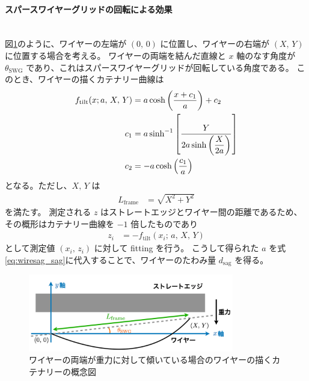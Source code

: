 \documentclass[../../main.tex]{subfiles}
\begin{document}
\paragraph{スパースワイヤーグリッドの回転による効果}\quad\\
\indent
図\ref{fig:wiresag_concept_tilt}のように、ワイヤーの左端が $(0,\,0)$ に位置し、ワイヤーの右端が $(X,\,Y)$ に位置する場合を考える。
ワイヤーの両端を結んだ直線と $x$ 軸のなす角度が $\theta_{\mathrm{SWG}}$ であり、これはスパースワイヤーグリッドが回転している角度である。
このとき、ワイヤーの描くカテナリー曲線は
\begin{align}
    \label{eq:wiresag_catenary_tilt}
    f_{\mathrm{tilt}}(x;a,\,X,\,Y) &= a\cosh\qty(\dfrac{x+c_1}{a}) + c_2 \\
    c_1 &= a\sinh^{-1}\qty[\dfrac{Y}{2a\sinh\qty(\dfrac{X}{2a})}] \\
    c_2 &= -a\cosh\qty(\dfrac{c_1}{a})
\end{align}
となる。ただし、$X,\,Y$ は
\begin{align}
    L_{\mathrm{frame}} &= \sqrt{X^2+Y^2}
\end{align}
を満たす。
測定される $z$ はストレートエッジとワイヤー間の距離であるため、その概形はカテナリー曲線を $-1$ 倍したものであり
\begin{align}
    z_{i} &= -f_{\mathrm{tilt}}(x_{i};\,a,\,X,\,Y)
\end{align}
として測定値 $(x_{i},\,z_{i})$ に対して fitting を行う。
こうして得られた $a$ を式\eqref{eq:wiresag_sag}に代入することで、ワイヤーのたわみ量 $d_{\mathrm{sag}}$ を得る。
\begin{figure}[H]
    \centering
    \includegraphics[width=0.8\textwidth]{wiresag/wire_catenary_tilt.pdf}
    \caption{ワイヤーの両端が重力に対して傾いている場合のワイヤーの描くカテナリーの概念図}
    \label{fig:wiresag_concept_tilt}
\end{figure}
\end{document}
